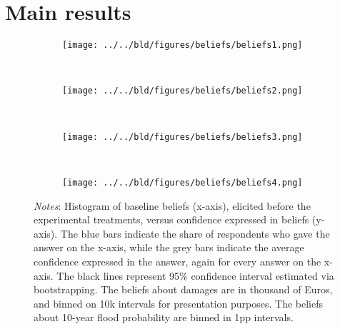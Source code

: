 \section{Main results}\label{main-results}



\clearpage

\begin{figure}
     \centering
     \caption{Baseline beliefs vs. confidence}
     \begin{subfigure}[b]{\linewidth}
        \centering
         \texttt{[image: ../../bld/figures/beliefs/beliefs1.png]}
         \label{fig:risk}
     \end{subfigure}\\[-3ex]
     \begin{subfigure}[b]{\linewidth}
         \centering
         \texttt{[image: ../../bld/figures/beliefs/beliefs2.png]}
         \label{fig:damages}
     \end{subfigure}\\[-2ex]
         \begin{subfigure}[b]{\linewidth}
         \centering
         \texttt{[image: ../../bld/figures/beliefs/beliefs3.png]}
         \label{fig:comptot}
     \end{subfigure}\\[-2ex]
     \begin{subfigure}[b]{\linewidth}
        \centering
         \texttt{[image: ../../bld/figures/beliefs/beliefs4.png]}
         \label{fig:compshare}
     \end{subfigure}
    \label{fig:beliefs-summary}
\justifying
\footnotesize \textit{Notes}: Histogram of baseline beliefs (x-axis), elicited before the experimental treatments, versus confidence expressed in beliefs (y-axis). The blue bars indicate the share of respondents who gave the answer on the x-axis, while the grey bars indicate the average confidence expressed in the answer, again for every answer on the x-axis. The black lines represent 95\% confidence interval estimated via bootstrapping. The beliefs about damages are in thousand of Euros, and binned on 10k intervals for presentation purposes. The beliefs about 10-year flood probability are binned in 1pp intervals. 
\end{figure}

\clearpage

